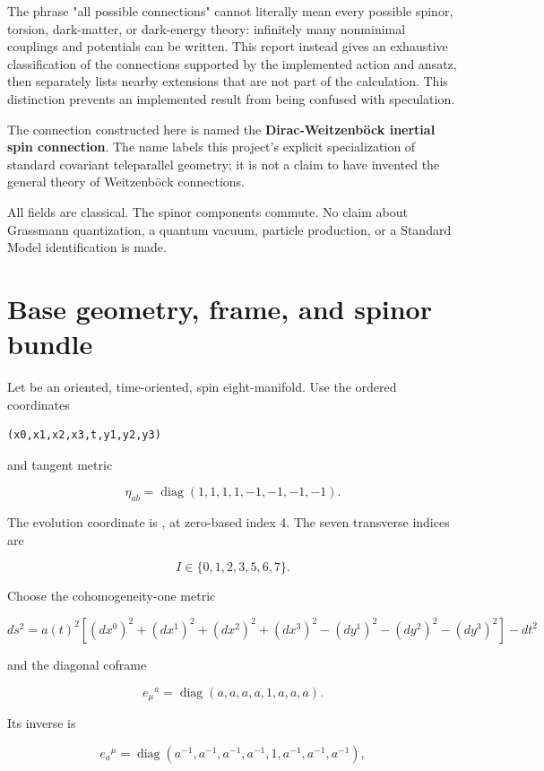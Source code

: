\documentclass[11pt]{article}
\begin{document}
The phrase "all possible connections" cannot literally mean every possible spinor, torsion, dark-matter, or dark-energy theory: infinitely many nonminimal couplings and potentials can be written. This report instead gives an exhaustive classification of the connections supported by the implemented action and ansatz, then separately lists nearby extensions that are not part of the calculation. This distinction prevents an implemented result from being confused with speculation.

The connection constructed here is named the \textbf{Dirac-Weitzenböck inertial spin connection}. The name labels this project's explicit specialization of standard covariant teleparallel geometry; it is not a claim to have invented the general theory of Weitzenböck connections.

All fields are classical. The spinor components commute. No claim about Grassmann quantization, a quantum vacuum, particle production, or a Standard Model identification is made.

\section{Base geometry, frame, and spinor bundle}

Let \texttt{} be an oriented, time-oriented, spin eight-manifold. Use the ordered coordinates

\begin{Verbatim}[fontsize=\small]
(x0,x1,x2,x3,t,y1,y2,y3)
\end{Verbatim}

and tangent metric

\[
\eta_{ab}=\operatorname{diag}(1,1,1,1,-1,-1,-1,-1).
\]

The evolution coordinate is \texttt{}, at zero-based index 4. The seven transverse indices are

\[
I\in\{0,1,2,3,5,6,7\}.
\]

Choose the cohomogeneity-one metric

\[
ds^2=a(t)^2\left[(dx^0)^2+(dx^1)^2+(dx^2)^2+(dx^3)^2
-(dy^1)^2-(dy^2)^2-(dy^3)^2\right]-dt^2
\]

and the diagonal coframe

\[
e_\mu{}^a=\operatorname{diag}(a,a,a,a,1,a,a,a).
\]

Its inverse is

\[
e_a{}^\mu=\operatorname{diag}
(a^{-1},a^{-1},a^{-1},a^{-1},1,a^{-1},a^{-1},a^{-1}),
\]
\end{document}
